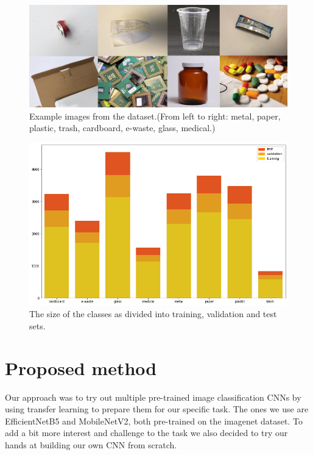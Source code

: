 \documentclass[twocolumn]{article}
\begin{document}
	\begin{figure}[h]
		\centering
		\includegraphics[width=\linewidth]{dataset_images.png}
		\caption{Example images from the dataset.(From left to right: metal, paper, plastic, trash, cardboard, e-waste, glass, medical.)}
		\label{dataset_images}
	\end{figure}
	
	\begin{figure}[h]
		\centering
		\includegraphics[width=\linewidth]{dataset.png}
		\caption{The size of the classes as divided into training, validation and test sets.}
		\label{dataset}
	\end{figure}
	
	\section{Proposed method}
	
	Our approach was to try out multiple pre-trained image classification CNNs by using transfer learning to prepare them for our specific task. The ones we use are EfficientNetB5 and MobileNetV2, both pre-trained on the imagenet dataset. To add a bit more interest and challenge to the task we also decided to try our hands at building our own CNN from scratch.
	
\end{document}
